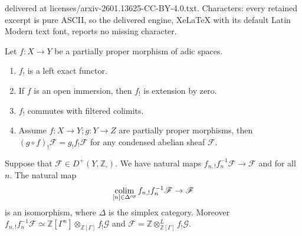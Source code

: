 \documentclass[10pt,a4paper]{amsart}
\DeclareMathOperator{\colim}{colim}
\def\bbZ{\mathbb{Z}}
\def\sF{{\mathscr{F}}}
\def\sG{{\mathscr{G}}}
\begin{document}
delivered at licenses/arxiv-2601.13625-CC-BY-4.0.txt. Characters: every retained excerpt is pure ASCII, so the delivered engine, XeLaTeX with its default Latin Modern text font, reports no missing character.
\begin{lemma}\label{lemmalowershriekcolimit}
Let $f:X\to Y$ be a partially proper morphism of adic spaces.
\begin{enumerate}[(1)]
	\item $f_!$ is a left exact functor.
	\item If $f$ is an open immersion, then $f_!$ is extension by zero.
	\item $f_!$ commutes with filtered colimits.
	\item Assume $f:X\to Y; g:Y\to Z$ are partially proper morphisms, then $(g\circ f)_!\sF=g_!f_!\sF$ for any condensed abelian sheaf $\sF$.
\end{enumerate}
\end{lemma}

\begin{lemma}\label{lemmashriekdescent}
	Suppose that $\sF\in D^+(Y,\bbZ_{\square})$. We have natural maps $f_{n,!}f_n^{-1}\sF\rightarrow \sF$ and for all $n$. The natural map 
	\[\colim_{[n]\in\Delta^{\rm op}}f_{n,!}f_n^{-1}\sF\rightarrow \sF\]
	is an isomorphism, where $\Delta$ is the simplex category. Moreover $f_{n,!}f_n^{-1}\sF\simeq \bbZ[\Gamma^n]\otimes_{\bbZ[\Gamma]}f_!\sG$ and $\sF=\bbZ\otimes^L_{\bbZ[\Gamma]}f_!\sG$.
\end{lemma}
\end{document}
